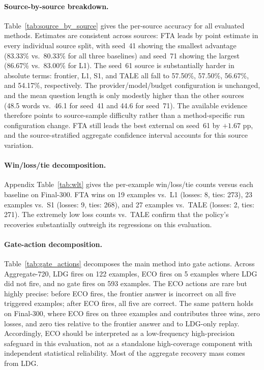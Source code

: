 \paragraph{Source-by-source breakdown.}
Table~\ref{tab:source_by_source} gives the per-source accuracy for all
evaluated methods.
Estimates are consistent across sources: FTA leads by point estimate in
every individual source split, with seed~41 showing the smallest advantage
(83.33\% vs.\ 80.33\% for all three baselines) and seed~71 showing the
largest (86.67\% vs.\ 83.00\% for L1).
The seed~61 source is substantially harder in absolute terms: frontier, L1,
S1, and TALE all fall to 57.50\%, 57.50\%, 56.67\%, and 54.17\%,
respectively.
The provider/model/budget configuration is unchanged, and the mean question
length is only modestly higher than the other sources (48.5 words vs.\ 46.1
for seed~41 and 44.6 for seed~71).
The available evidence therefore points to source-sample difficulty rather
than a method-specific run configuration change.
FTA still leads the best external on seed~61 by $+1.67$ pp, and the
source-stratified aggregate confidence interval accounts for this source
variation.

\paragraph{Win/loss/tie decomposition.}
Appendix Table~\ref{tab:wlt} gives the per-example win/loss/tie counts
versus each baseline on Final-300.
FTA wins on 19 examples vs.\ L1 (losses: 8, ties: 273),
23 examples vs.\ S1 (losses: 9, ties: 268), and 27 examples vs.\ TALE
(losses: 2, ties: 271).
The extremely low loss counts vs.\ TALE confirm that the policy's recoveries
substantially outweigh its regressions on this evaluation.

\paragraph{Gate-action decomposition.}
Table~\ref{tab:gate_actions} decomposes the main method into gate actions.
Across Aggregate-720, LDG fires on 122 examples, ECO fires on 5 examples
where LDG did not fire, and no gate fires on 593 examples.
The ECO actions are rare but highly precise: before ECO fires, the frontier
answer is incorrect on all five triggered examples; after ECO fires, all
five are correct.
The same pattern holds on Final-300, where ECO fires on three examples and
contributes three wins, zero losses, and zero ties relative to the frontier
answer and to LDG-only replay.
Accordingly, ECO should be interpreted as a low-frequency high-precision
safeguard in this evaluation, not as a standalone high-coverage component
with independent statistical reliability.
Most of the aggregate recovery mass comes from LDG.

